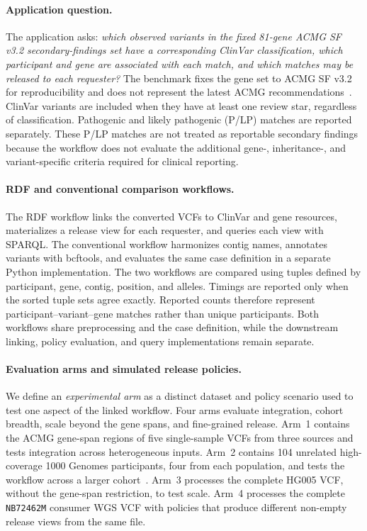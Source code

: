 \documentclass[pdflatex,sn-mathphys-num]{sn-jnl}
\begin{document}
\paragraph{Application question.}
The application asks: \emph{which observed variants in the fixed 81-gene ACMG SF v3.2 secondary-findings set have a corresponding ClinVar classification, which participant and gene are associated with each match, and which matches may be released to each requester?}
The benchmark fixes the gene set to ACMG SF v3.2 for reproducibility and does not represent the latest ACMG recommendations~\cite{miller2023acmg}.
ClinVar variants are included when they have at least one review star, regardless of classification.
Pathogenic and likely pathogenic (P/LP) matches are reported separately.
These P/LP matches are not treated as reportable secondary findings because the workflow does not evaluate the additional gene-, inheritance-, and variant-specific criteria required for clinical reporting.

\paragraph{RDF and conventional comparison workflows.}
The RDF workflow links the converted VCFs to ClinVar and gene resources, materializes a release view for each requester, and queries each view with SPARQL.
The conventional workflow harmonizes contig names, annotates variants with bcftools, and evaluates the same case definition in a separate Python implementation.
The two workflows are compared using tuples defined by participant, gene, contig, position, and alleles.
Timings are reported only when the sorted tuple sets agree exactly.
Reported counts therefore represent participant--variant--gene matches rather than unique participants.
Both workflows share preprocessing and the case definition, while the downstream linking, policy evaluation, and query implementations remain separate.

\paragraph{Evaluation arms and simulated release policies.}
We define an \emph{experimental arm} as a distinct dataset and policy scenario used to test one aspect of the linked workflow.
Four arms evaluate integration, cohort breadth, scale beyond the gene spans, and fine-grained release.
Arm~1 contains the ACMG gene-span regions of five single-sample VCFs from three sources and tests integration across heterogeneous inputs.
Arm~2 contains 104 unrelated high-coverage 1000 Genomes participants, four from each population, and tests the workflow across a larger cohort~\cite{byrska2022highcoverage}.
Arm~3 processes the complete HG005 VCF, without the gene-span restriction, to test scale.
Arm~4 processes the complete \texttt{NB72462M} consumer WGS VCF with policies that produce different non-empty release views from the same file.
\end{document}
